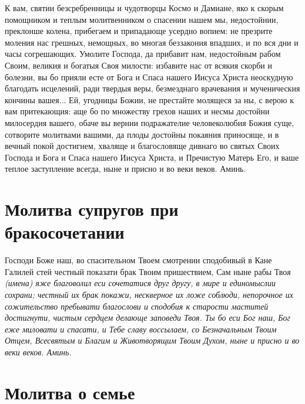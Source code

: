 К вам, святии безсребренницы и чудотворцы Космо и Дамиане, яко к скорым помощником и теплым молитвенником о спасении нашем мы, недостойнии, преклонше колена, прибегаем и припадающе усердно вопием: не презрите моления нас грешных, немощных, во многая беззакония впадших, и по вся дни и часы согрешающих. Умолите Господа, да прибавит нам, недостойным рабом Своим, великия и богатыя Своя милости: избавите нас от всякия скорби и болезни, вы бо прияли есте от Бога и Спаса нашего Иисуса Христа неоскудную благодать исцелений, ради твердыя веры, безмезднаго врачевания и мученическия кончины вашея... Ей, угодницы Божии, не престайте молящеся за ны, с верою к вам притекающия: аще бо по множеству грехов наших и несмы достойни милосердия вашего, обаче вы вернии подражателие человеколюбия Божия суще, сотворите молитвами вашими, да плоды достойны покаяния приносяще, и в вечный покой достигнем, хваляще и благословяще дивнаго во святых Своих Господа и Бога и Спаса нашего Иисуса Христа, и Пречистую Матерь Его, и ваше теплое заступление всегда, ныне и присно и во веки веков. Аминь. 

 



\longpage{}\section{Молитва супругов при бракосочетании}
 

Господи Боже наш, во спасительном Твоем смотрении сподобивый в Кане Галилей стей честный показати брак Твоим пришествием, Сам ныне рабы Тво\itshape я (имен\normalfont{}а) яже благоволил еси сочетатися друг другу, в мире и единомыслии сохрани; честный их брак покажи, нескверное их ложе соблюди, непорочное их сожительство пребывати благослови и сподобия к старости маститей достигнути, чистым сердцем делающе заповеди Твоя. Ты бо еси Бог наш, Бог еже миловати и спасати, и Тебе славу воссылаем, со Безначальным Твоим Отцем, Всесвятым и Благим и Животворящим Твоим Духом, ныне и присно и во веки веков. Аминь. 





\section{Молитва о семье}
 

